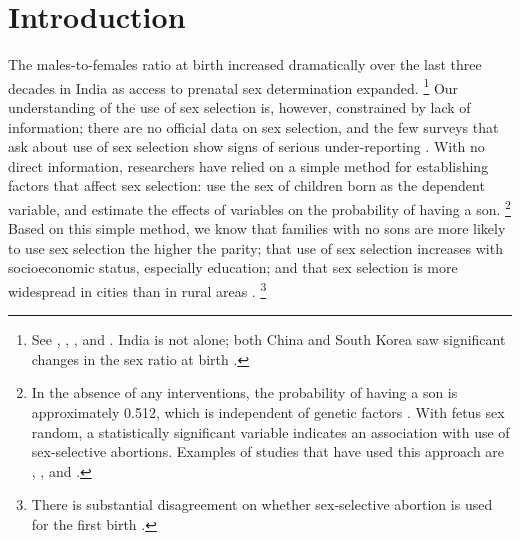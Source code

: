 \documentclass[12pt,letterpaper]{article}
\begin{document}
\section{Introduction\label{sec:intro}}


The males-to-females ratio at birth increased dramatically over the last three 
decades in India as access to prenatal sex determination expanded.%
\footnote{
See \citet{das_gupta97}, \citet{Sudha1999},
\citet{Arnold2002}, \cite{retherford03b} and \citet{jha06}.
India is not alone; both China and South Korea saw
significant changes in the sex ratio at birth \citep{Yi1993,park95}.
}
Our understanding of the use of sex selection is, however, constrained by 
lack of information;
there are no official data on sex selection, and the few surveys that ask about use of 
sex selection show signs of serious under-reporting \citep{goodkind96}.
With no direct information, researchers have relied on a simple method for establishing 
factors that affect sex selection: use the sex of children born as the 
dependent variable, and estimate the effects of variables on the probability of having a son.%
\footnote{
In the absence of any interventions, the probability of having a son
is approximately 0.512, which is independent of genetic factors \citep{ben-porath76b,jacobsen99}.
With fetus sex random, a statistically significant variable indicates an association with 
use of sex-selective abortions.
Examples of studies that have used this approach are \cite{retherford03b},
\cite{jha06}, and \cite{abrevaya09}. 
}
Based on this simple method, we know that families with no sons are more likely to
use sex selection the higher the parity;
that use of sex selection increases with socioeconomic status, especially education;
and that sex selection is more widespread in cities than in rural areas 
\citep{retherford03b,jha06,abrevaya09}.%
\footnote{
There is substantial disagreement on whether sex-selective abortion is used for the 
first birth \citep{retherford03b,jha06}.
}
\end{document}
